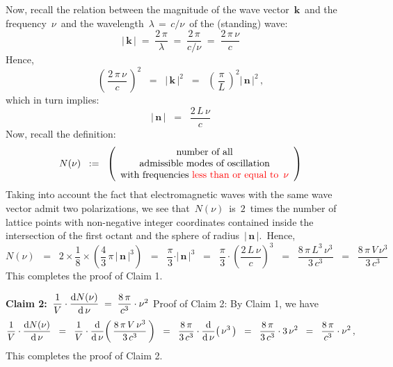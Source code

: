\vskip 0.2cm
\noindent
Now, recall the relation between the magnitude of the wave vector \,$\mathbf{k}$\,
and the frequency \,$\nu$\, and the wavelength \,$\lambda \,=\, c/\nu$\,
of the (standing) wave:
\begin{equation*}
\vert\,\mathbf{k}\,\vert
\; = \;
    \dfrac{2\,\pi}{\lambda}
\; = \;
    \dfrac{2\,\pi}{c/\nu}
\; = \;
    \dfrac{2\,\pi\,\nu}{c}
\end{equation*}
Hence,
\begin{equation*}
\left(\,\dfrac{2\,\pi\,\nu}{c}\,\right)^{2}
\;\; = \;\;
    \vert\,\mathbf{k}\,\vert^{2}
\;\; = \;\;
    \left(\,\dfrac{\pi}{L}\,\right)^{2}
    \vert\,\mathbf{n}\,\vert^{2}\,,
\end{equation*}
which in turn implies:
\begin{equation*}
\vert\,\mathbf{n}\,\vert
\;\; = \;\;
    \dfrac{2\,L\,\nu}{c}
\end{equation*}
Now, recall the definition:
\begin{equation*}
N(\nu)
\;\; := \;\;
    \left(\begin{array}{c}
        \textnormal{number of all}
        \\
        \textnormal{admissible modes of oscillation}
        \\
        \textnormal{with frequencies {\color{red}less than or equal to \,$\nu$}}
        \end{array}\right)
\end{equation*}
Taking into account the fact that electromagnetic waves with the same wave vector
admit two polarizations, we see that
\,$N(\nu)$\,
is \,$2$\, times the number of lattice points with non-negative integer coordinates
contained inside the intersection of the first octant and
the sphere of radius \,$\vert\,\mathbf{n}\,\vert$.\,
Hence,
\begin{equation*}
N(\nu)
\;\; = \;\;
    2 \times \dfrac{1}{8} \times \left(\dfrac{4}{3}\,\pi\,\vert\,\mathbf{n}\,\vert^{3}\right)
\;\; = \;\;
    \dfrac{\pi}{3} \cdot \vert\,\mathbf{n}\,\vert^{3}
\;\; = \;\;
    \dfrac{\pi}{3} \cdot \left(\dfrac{2\,L\,\nu}{c}\right)^{3}
\;\; = \;\;
    \dfrac{8\,\pi\,L^{3}\,\nu^{3}}{3\,c^{3}}
\;\; = \;\;
    \dfrac{8\,\pi\,V\,\nu^{3}}{3\,c^{3}}
\end{equation*}
This completes the proof of Claim 1.

\vskip 0.4cm
\noindent
\textbf{Claim 2:}\;\,
$
\dfrac{1}{V}\cdot\dfrac{\textnormal{d} N(\nu)}{\textnormal{d}\,\nu}
\; = \;
    \dfrac{
        8\,\pi
        }{
        c^{3}
        }
    \cdot
    \nu^{2}
$
\vskip 0.2cm
\noindent
Proof of Claim 2:\;
By Claim 1, we have
\begin{equation*}
\dfrac{1}{V}\cdot\dfrac{\textnormal{d} N(\nu)}{\textnormal{d}\,\nu}
\;\; = \;\;
    \dfrac{1}{V}
    \cdot
    \dfrac{\textnormal{d}}{\textnormal{d}\,\nu}\!\left(\,
        \dfrac{8\,\pi\,V\,\nu^{3}}{3\,c^{3}}
        \,\right)
\;\; = \;\;
    \dfrac{8\,\pi}{3\,c^{3}}
    \cdot
    \dfrac{\textnormal{d}}{\textnormal{d}\,\nu}\!\left(\,
        \nu^{3}
        \,\right)
\;\; = \;\;
    \dfrac{8\,\pi}{3\,c^{3}}
    \cdot
    3\,\nu^{2}
\;\; = \;\;
    \dfrac{8\,\pi}{c^{3}}
    \cdot
    \nu^{2}\,,
\end{equation*}
This completes the proof of Claim 2.

